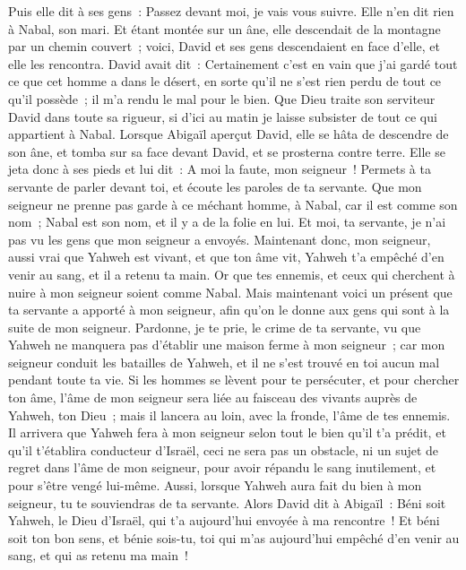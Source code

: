 \begin{multicols}{2}
Puis elle dit à ses gens~: Passez devant moi, je vais vous suivre. Elle n'en dit rien à Nabal, son mari.
Et étant montée sur un âne, elle descendait de la montagne par un chemin couvert~; voici, David et ses gens descendaient en face d'elle, et elle les rencontra.
David avait dit~: Certainement c'est en vain que j'ai gardé tout ce que cet homme a dans le désert, en sorte qu'il ne s'est rien perdu de tout ce qu'il possède~; il m'a rendu le mal pour le bien.
Que Dieu traite son serviteur David dans toute sa rigueur, si d'ici au matin je laisse subsister de tout ce qui appartient à Nabal.
Lorsque Abigaïl aperçut David, elle se hâta de descendre de son âne, et tomba sur sa face devant David, et se prosterna contre terre.
Elle se jeta donc à ses pieds et lui dit~: A moi la faute, mon seigneur~! Permets à ta servante de parler devant toi, et écoute les paroles de ta servante.
Que mon seigneur ne prenne pas garde à ce méchant homme, à Nabal, car il est comme son nom~; Nabal est son nom, et il y a de la folie en lui. Et moi, ta servante, je n'ai pas vu les gens que mon seigneur a envoyés.
Maintenant donc, mon seigneur, aussi vrai que Yahweh est vivant, et que ton âme vit, Yahweh t'a empêché d'en venir au sang, et il a retenu ta main. Or que tes ennemis, et ceux qui cherchent à nuire à mon seigneur soient comme Nabal.
Mais maintenant voici un présent que ta servante a apporté à mon seigneur, afin qu'on le donne aux gens qui sont à la suite de mon seigneur.
Pardonne, je te prie, le crime de ta servante, vu que Yahweh ne manquera pas d'établir une maison ferme à mon seigneur~; car mon seigneur conduit les batailles de Yahweh, et il ne s'est trouvé en toi aucun mal pendant toute ta vie.
Si les hommes se lèvent pour te persécuter, et pour chercher ton âme, l'âme de mon seigneur sera liée au faisceau des vivants auprès de Yahweh, ton Dieu~; mais il lancera au loin, avec la fronde, l'âme de tes ennemis.
Il arrivera que Yahweh fera à mon seigneur selon tout le bien qu'il t'a prédit, et qu'il t'établira conducteur d'Israël,
ceci ne sera pas un obstacle, ni un sujet de regret dans l'âme de mon seigneur, pour avoir répandu le sang inutilement, et pour s'être vengé lui-même. Aussi, lorsque Yahweh aura fait du bien à mon seigneur, tu te souviendras de ta servante.
Alors David dit à Abigaïl~: Béni soit Yahweh, le Dieu d'Israël, qui t'a aujourd'hui envoyée à ma rencontre~!
Et béni soit ton bon sens, et bénie sois-tu, toi qui m'as aujourd'hui empêché d'en venir au sang, et qui as retenu ma main~!

\end{multicols}
